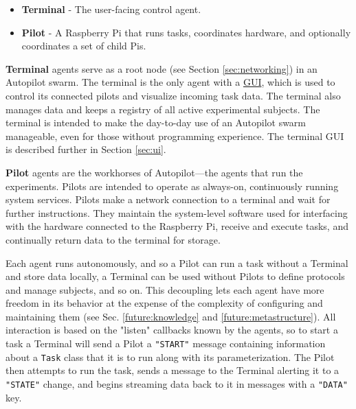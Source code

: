 \begin{itemize}
    \item \textbf{Terminal} - The user-facing control agent.
    \item \textbf{Pilot} - A Raspberry Pi that runs tasks, coordinates hardware, and optionally coordinates a set of child Pis.
\end{itemize}



\textbf{Terminal} agents serve as a root node (see Section \ref{sec:networking}) in an Autopilot swarm. The terminal is the only agent with a \hyperref[sec:ui]{GUI}, which is used to control its connected pilots and visualize incoming task data. The terminal also manages data and keeps a registry of all active experimental subjects. The terminal is intended to make the day-to-day use of an Autopilot swarm manageable, even for those without programming experience. The terminal GUI is described further in Section \ref{sec:ui}.

\textbf{Pilot} agents are the workhorses of Autopilot---the agents that run the experiments. Pilots are intended to operate as always-on, continuously running system services. Pilots make a network connection to a terminal and wait for further instructions. They maintain the system-level software used for interfacing with the hardware connected to the Raspberry Pi, receive and execute tasks, and continually return data to the terminal for storage.

Each agent runs autonomously, and so a Pilot can run a task without a Terminal and store data locally, a Terminal can be used without Pilots to define protocols and manage subjects, and so on. This decoupling lets each agent have more freedom in its behavior at the expense of the complexity of configuring and maintaining them (see Sec. \ref{future:knowledge} and \ref{future:metastructure}). All interaction is based on the "listen" callbacks known by the agents, so to start a task a Terminal will send a Pilot a \texttt{"START"} message containing information about a \texttt{Task} class that it is to run along with its parameterization. The Pilot then attempts to run the task, sends a message to the Terminal alerting it to a \texttt{"STATE"} change, and begins streaming data back to it in messages with a \texttt{"DATA"} key.

